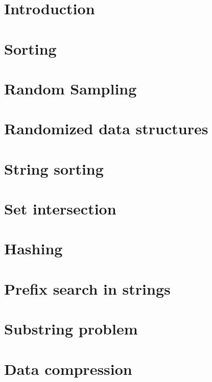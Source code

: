 \documentclass{report}
\begin{document}


\chapter{Introduction}


\chapter{Sorting}


\chapter{Random Sampling}


\chapter{Randomized data structures}


\chapter{String sorting}


\chapter{Set intersection}


\chapter{Hashing}


\chapter{Prefix search in strings}


\chapter{Substring problem}


\chapter{Data compression}

\end{document}

